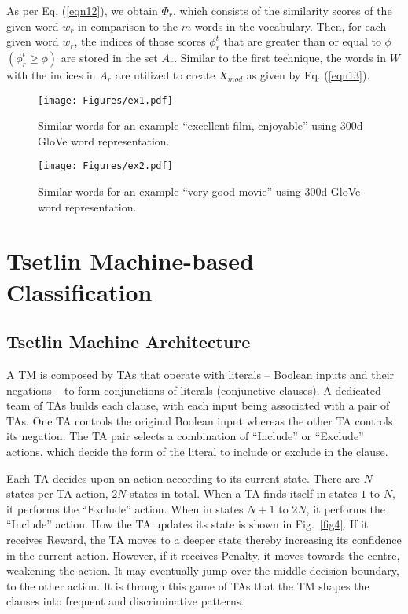 \documentclass[11pt]{article}
\begin{document}
\par As per Eq. (\ref{eqn12}), we obtain $\Phi_r$, which consists of the similarity scores of the given word $w_r$ in comparison to the $m$ words in the vocabulary. Then, for each given word $w_r$, the indices of those scores $\phi_r^t$ that are greater than or equal to $\phi$ $(\phi_r^t\geq \phi)$  are stored in the set $A_r$. Similar to the first technique, the words in $W$ with the indices in $A_r$ are utilized to create $X_{mod}$ as given by Eq. (\ref{eqn13}).

\begin{figure}
    \centering
    \texttt{[image: Figures/ex1.pdf]}
    \caption{Similar words for an example ``excellent film, enjoyable'' using 300d GloVe word representation.}
    \label{fig2}
\end{figure}

\begin{figure}
    \centering
    \texttt{[image: Figures/ex2.pdf]}
    \caption{Similar words for an example ``very good movie'' using 300d GloVe word representation.}
    \label{fig3}
\end{figure}

\section{Tsetlin Machine-based Classification}\label{TM}
\subsection{Tsetlin Machine Architecture}

A TM is composed by TAs that operate with literals -- Boolean inputs and their negations -- to form conjunctions of literals (conjunctive clauses). A dedicated team of TAs builds each clause, with each input being associated with a pair of TAs. One TA controls the original Boolean input whereas the other TA controls its negation. The TA pair selects a combination of ``Include'' or ``Exclude'' actions, which decide the form of the literal to include or exclude in the clause.

Each TA decides upon an action according to its current state. There are \(N\) states per TA action, \(2N\) states in total. When a TA finds itself in states \(1\) to \(N\), it performs the ``Exclude'' action. When in states \(N+1\) to \(2N\), it performs the ``Include'' action. How the TA updates its state is shown in Fig.~\ref{fig4}. If it receives Reward, the TA moves to a deeper state thereby increasing its confidence in the current action. However, if it receives Penalty, it moves towards the centre, weakening the action. It may eventually jump over the middle decision boundary, to the other action. It is through this game of TAs that the TM shapes the clauses into frequent and discriminative patterns.
\end{document}
